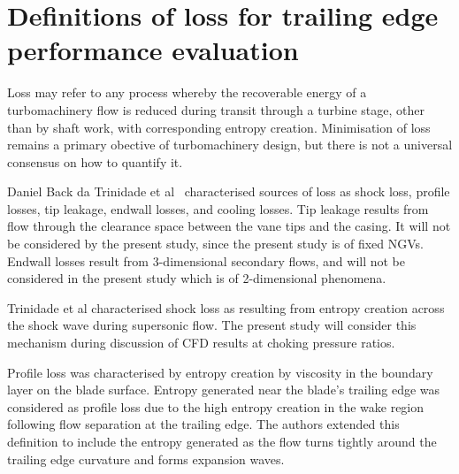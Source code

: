 \documentclass[a4paper, 11pt, twoside]{report}
\begin{document}



\section{Definitions of loss for trailing edge performance evaluation}

Loss may refer to any process whereby the recoverable energy of a turbomachinery flow is reduced during transit through a turbine stage, other than by shaft work, with corresponding entropy creation. Minimisation of loss remains a primary obective of turbomachinery design, but there is not a universal consensus on how to quantify it.

Daniel Back da Trinidade et al~\cite{trinidade_loss} characterised sources of loss as shock loss, profile losses, tip leakage, endwall losses, and cooling losses. Tip leakage results from flow through the clearance space between the vane tips and the casing. It will not be considered by the present study, since the present study is of fixed NGVs. Endwall losses result from 3-dimensional secondary flows, and will not be considered in the present study which is of 2-dimensional phenomena.

Trinidade et al characterised shock loss as resulting from entropy creation across the shock wave during supersonic flow. The present study will consider this mechanism during discussion of CFD results at choking pressure ratios.

Profile loss was characterised by entropy creation by viscosity in the boundary layer on the blade surface. Entropy generated near the blade's trailing edge was considered as profile loss due to the high entropy creation in the wake region following flow separation at the trailing edge. The authors extended this definition to include the entropy generated as the flow turns tightly around the trailing edge curvature and forms expansion waves.
\end{document}
